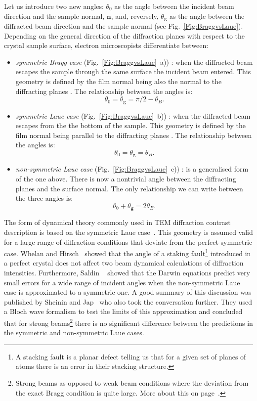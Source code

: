 Let us introduce two new angles: $\theta_0$ as the angle between the incident beam direction and the sample normal, $\mathbf{n}$,  and, reversely, $\theta_\mathbf{g}$ as the angle between the diffracted beam direction and the sample normal (see Fig.~\ref{Fig:BraggvsLaue}). 
Depending on the general direction of the diffraction planes with respect to the crystal sample surface, electron microscopists differentiate between:
\begin{itemize}
    \item \emph{symmetric Bragg case} (Fig.~\ref{Fig:BraggvsLaue}~a)) :  when the diffracted beam escapes the sample through the same surface the incident beam entered. This geometry is defined by the film normal being also the normal to the diffracting planes . The relationship between the angles is:
    \begin{equation*}
        \theta_0 =   \theta_\mathbf{g} =\pi/2 -\theta_B.
    \end{equation*}
     \item \emph{symmetric Laue case} (Fig.~\ref{Fig:BraggvsLaue}~b)) : when the diffracted beam escapes from the the bottom of the sample. This geometry is defined by the film normal being parallel to the  diffracting planes .  The relationship between the angles is:
      \[ \theta_0 =   \theta_\mathbf{g} = \theta_B.\]
    \item  \emph{non-symmetric Laue case} (Fig.~\ref{Fig:BraggvsLaue}~c)) : is a generalised form of the one above. There is now  a nontrivial angle between the diffracting planes and the surface normal. The only relationship we can write between the three angles is:
    \[ \theta_0 +  \theta_\mathbf{g} = 2 \theta_B.\]
\end{itemize}
\vspace{-0.5cm}

 The form of dynamical theory commonly used in TEM diffraction contrast description is based on the symmetric Laue case~\cite{Howie61}. This geometry is assumed valid for a large range of diffraction conditions that deviate from the perfect symmetric case.  Whelan and Hirsch~\cite{Whelan57} showed that the angle of a staking fault\footnote{A stacking fault is a planar defect telling us that for a given set of planes of atoms there is an error in their stacking structure. } introduced in a perfect crystal does not affect two beam dynamical calculations of diffraction intensities. Furthermore, Saldin \etal~\cite{Saldin78} showed that the Darwin equations predict very small errors for a wide range of incident angles when the non-symmetric Laue case is approximated to a symmetric one. A good summary of this discussion was published by Sheinin and Jap~\cite{Sheinin79} who also took the conversation further. They used a Bloch wave formalism to test the limits of this approximation and concluded that for strong beams\footnote{ Strong beams as opposed to weak beam conditions where the deviation from the exact Bragg condition is quite large. More about this on page~\pageref{sec:sg}.} there is no significant difference between the predictions in the symmetric and non-symmetric Laue cases.



